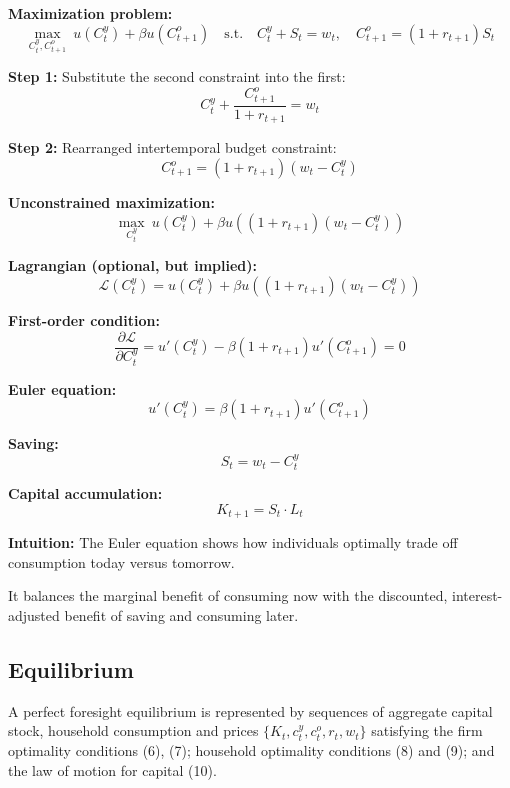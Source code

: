 \documentclass[12pt]{article}
\begin{document}
{\color{blue}
\textbf{Maximization problem:}
\[
\max_{C_t^y, C_{t+1}^o} \ u(C_t^y) + \beta u(C_{t+1}^o)
\quad \text{s.t.} \quad C_t^y + S_t = w_t, \quad C_{t+1}^o = (1 + r_{t+1}) S_t
\]

\textbf{Step 1:} Substitute the second constraint into the first:
\[
C_t^y + \frac{C_{t+1}^o}{1 + r_{t+1}} = w_t
\]

\textbf{Step 2:} Rearranged intertemporal budget constraint:
\[
C_{t+1}^o = (1 + r_{t+1})(w_t - C_t^y)
\]

\textbf{Unconstrained maximization:}
\[
\max_{C_t^y} \ u(C_t^y) + \beta u\left((1 + r_{t+1})(w_t - C_t^y)\right)
\]

\textbf{Lagrangian (optional, but implied):}
\[
\mathcal{L}(C_t^y) = u(C_t^y) + \beta u\left((1 + r_{t+1})(w_t - C_t^y)\right)
\]

\textbf{First-order condition:}
\[
\frac{\partial \mathcal{L}}{\partial C_t^y} = u'(C_t^y) - \beta (1 + r_{t+1}) u'\left(C_{t+1}^o\right) = 0
\]

\textbf{Euler equation:}
\[
u'(C_t^y) = \beta (1 + r_{t+1}) u'(C_{t+1}^o)
\]

\textbf{Saving:}
\[
S_t = w_t - C_t^y
\]

\textbf{Capital accumulation:}
\[
K_{t+1} = S_t \cdot L_t
\]

}

\textbf{Intuition:} The Euler equation shows how individuals optimally trade off consumption today versus tomorrow.

It balances the marginal benefit of consuming now with the discounted, interest-adjusted benefit of saving and consuming later.

\subsection*{\noindent\textbf{Equilibrium}}

A perfect foresight equilibrium is represented by sequences of aggregate capital stock, household consumption and prices $\{K_t, c_t^y, c_t^o, r_t, w_t\}$ satisfying the firm optimality conditions (6), (7); household optimality conditions (8) and (9); and the law of motion for capital (10).
\end{document}
